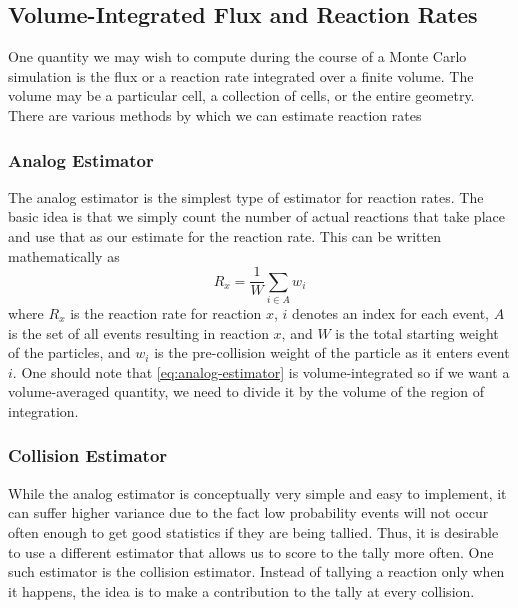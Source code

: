 \subsection{Volume-Integrated Flux and Reaction Rates}

One quantity we may wish to compute during the course of a Monte Carlo
simulation is the flux or a reaction rate integrated over a finite volume. The
volume may be a particular cell, a collection of cells, or the entire
geometry. There are various methods by which we can estimate reaction rates

\subsubsection{Analog Estimator}

The analog estimator is the simplest type of estimator for reaction rates. The
basic idea is that we simply count the number of actual reactions that take
place and use that as our estimate for the reaction rate. This can be written
mathematically as
\begin{equation}
  \label{eq:analog-estimator}
  R_x = \frac{1}{W} \sum_{i \in A} w_i
\end{equation}
where $R_x$ is the reaction rate for reaction $x$, $i$ denotes an index for each
event, $A$ is the set of all events resulting in reaction $x$, and $W$ is the
total starting weight of the particles, and $w_i$ is the pre-collision weight of
the particle as it enters event $i$. One should note that
\eqref{eq:analog-estimator} is volume-integrated so if we want a volume-averaged
quantity, we need to divide it by the volume of the region of integration.

\subsubsection{Collision Estimator}

While the analog estimator is conceptually very simple and easy to implement, it
can suffer higher variance due to the fact low probability events will not occur
often enough to get good statistics if they are being tallied. Thus, it is
desirable to use a different estimator that allows us to score to the tally more
often. One such estimator is the collision estimator. Instead of tallying a
reaction only when it happens, the idea is to make a contribution to the tally
at every collision.

